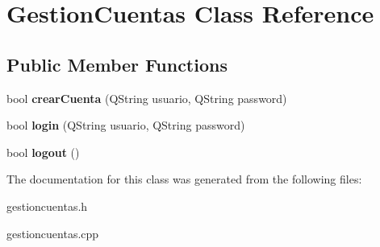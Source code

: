 \hypertarget{classGestionCuentas}{}\section{Gestion\+Cuentas Class Reference}
\label{classGestionCuentas}
\subsection*{Public Member Functions}
\begin{DoxyCompactItemize}
\item 
\mbox{\label{classGestionCuentas_ad1011cdf938d3dfa9c4afe14bd2e612b}} 
bool {\bfseries crear\+Cuenta} (Q\+String usuario, Q\+String password)
\item 
\mbox{\label{classGestionCuentas_a7a69689d138c3e6353b0c114c31921fa}} 
bool {\bfseries login} (Q\+String usuario, Q\+String password)
\item 
\mbox{\label{classGestionCuentas_a6ed99a214bc19754515cd95f0aef855a}} 
bool {\bfseries logout} ()
\end{DoxyCompactItemize}


The documentation for this class was generated from the following files\+:\begin{DoxyCompactItemize}
\item 
gestioncuentas.\+h\item 
gestioncuentas.\+cpp\end{DoxyCompactItemize}
